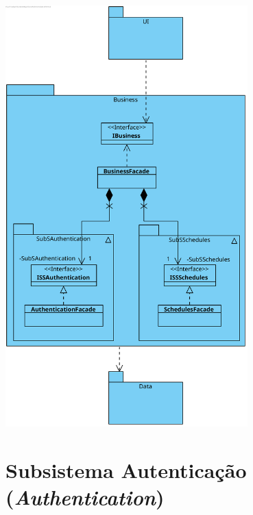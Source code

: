 \documentclass[a4paper,12pt]{scrreprt}
\begin{document}
\begin{minipage}{\textwidth}
    \centering
    \includegraphics[width=0.7\textwidth]{images/class-diagrams/1-arquitetura-geral.png}
    \label{fig:5-1-arquitetura_geral}
\end{minipage}

\section{Subsistema Autenticação (\textit{Authentication})}
\end{document}
